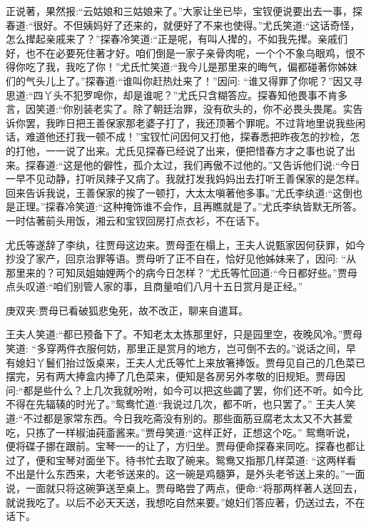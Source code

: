 \begin{parag}
    正说著，果然报:“云姑娘和三姑娘来了。”大家让坐已毕，宝钗便说要出去一事，探春道:“很好。不但姨妈好了还来的，就便好了不来也使得。”尤氏笑道:“这话奇怪，怎么撵起亲戚来了？”探春冷笑道:“正是呢，有叫人撵的，不如我先撵。亲戚们好，也不在必要死住著才好。咱们倒是一家子亲骨肉呢，一个个不象乌眼鸡，恨不得你吃了我，我吃了你！”尤氏忙笑道:“我今儿是那里来的晦气，偏都碰著你姊妹们的气头儿上了。”探春道:“谁叫你赶热灶来了！”因问: “谁又得罪了你呢？”因又寻思道:“四丫头不犯罗唣你，却是谁呢？”尤氏只含糊答应。探春知他畏事不肯多言，因笑道:“你别装老实了。除了朝廷治罪，没有砍头的，你不必畏头畏尾。实告诉你罢，我昨日把王善保家那老婆子打了，我还顶著个罪呢。不过背地里说我些闲话，难道他还打我一顿不成！”宝钗忙问因何又打他，探春悉把昨夜怎的抄检，怎的打他，一一说了出来。尤氏见探春已经说了出来，便把惜春方才之事也说了出来。探春道:“这是他的僻性，孤介太过，我们再傲不过他的。”又告诉他们说:“今日一早不见动静，打听凤辣子又病了。我就打发我妈妈出去打听王善保家的是怎样。回来告诉我说，王善保家的挨了一顿打，大太太嗔著他多事。”尤氏李纨道:“这倒也是正理。”探春冷笑道:“这种掩饰谁不会作，且再瞧就是了。”尤氏李纨皆默无所答。一时估著前头用饭，湘云和宝钗回房打点衣衫，不在话下。
\end{parag}


\begin{parag}
    尤氏等遂辞了李纨，往贾母这边来。贾母歪在榻上，王夫人说甄家因何获罪，如今抄没了家产，回京治罪等语。贾母听了正不自在，恰好见他姊妹来了，因问: “从那里来的？可知凤姐妯娌两个的病今日怎样？”尤氏等忙回道:“今日都好些。”贾母点头叹道:“咱们别管人家的事，且商量咱们八月十五日赏月是正经。”\begin{note}庚双夹:贾母已看破狐悲兔死，故不改正，聊来自遣耳。\end{note}王夫人笑道:“都已预备下了。不知老太太拣那里好，只是园里空，夜晚风冷。”贾母笑道: “多穿两件衣服何妨，那里正是赏月的地方，岂可倒不去的。”说话之间，早有媳妇丫鬟们抬过饭桌来，王夫人尤氏等忙上来放箸捧饭。贾母见自己的几色菜已摆完，另有两大捧盒内捧了几色菜来，便知是各房另外孝敬的旧规矩。贾母因问:“都是些什么？上几次我就吩咐，如今可以把这些蠲了罢，你们还不听。如今比不得在先辐辏的时光了。”鸳鸯忙道:“我说过几次，都不听，也只罢了。” 王夫人笑道:“不过都是家常东西。今日我吃斋没有别的。那些面筋豆腐老太太又不大甚爱吃，只拣了一样椒油莼齑酱来。”贾母笑道:“这样正好，正想这个吃。” 鸳鸯听说，便将碟子挪在跟前。宝琴一一的让了，方归坐。贾母便命探春来同吃。探春也都让过了，便和宝琴对面坐下。待书忙去取了碗来。鸳鸯又指那几样菜道: “这两样看不出是什么东西来，大老爷送来的。这一碗是鸡髓笋，是外头老爷送上来的。”一面说，一面就只将这碗笋送至桌上。贾母略尝了两点，便命:“将那两样著人送回去，就说我吃了。以后不必天天送，我想吃自然来要。”媳妇们答应著，仍送过去，不在话下。
\end{parag}


